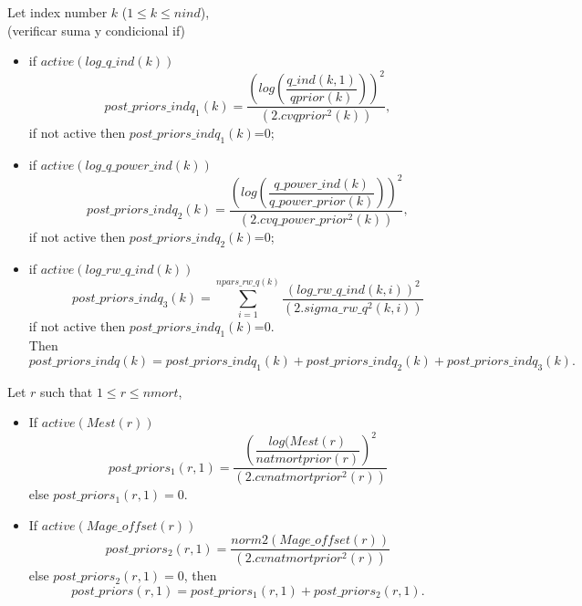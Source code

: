 \documentclass{article}
\begin{document}
Let index number $k$ ($1\leq k \leq nind$),\\ 
(verificar suma y condicional if)
\begin{itemize}
    \item if $active(log\_q\_ind(k))$
    \begin{equation}
        post\_priors\_indq_1(k) = \dfrac{\left(log\left(\dfrac{q\_ind(k,1)}{qprior(k)}\right)\right)^2}{(2.cvqprior^2(k))},
    \end{equation}
    if not active then $post\_priors\_indq_1(k)$=0;
    \item if $active(log\_q\_power\_ind(k))$
    \begin{equation}
        post\_priors\_indq_2(k) = \dfrac{\left(log\left(\dfrac{q\_power\_ind(k)}{q\_power\_prior(k)}\right)\right)^2}{(2.cvq\_power\_prior^2(k))},
    \end{equation}
    if not active then $post\_priors\_indq_2(k)$=0;
    \item if $active(log\_rw\_q\_ind(k))$
    \begin{equation}
        post\_priors\_indq_3(k) = \sum_{i=1}^{npars\_rw\_q(k)}\dfrac{(log\_rw\_q\_ind(k,i))^2}{(2.sigma\_rw\_q^2(k,i))}
    \end{equation}
    if not active then $post\_priors\_indq_1(k)$=0.\\
    
    Then 
    \begin{equation}
         post\_priors\_indq(k)=post\_priors\_indq_1(k)+post\_priors\_indq_2(k)+ post\_priors\_indq_3(k).
    \end{equation}
    
    \end{itemize}
    Let $r$ such that $1\leq r \leq nmort$,
    \begin{itemize}
        \item If $active(Mest(r))$
        \begin{equation}
            post\_priors_1(r,1) = \dfrac{\left(\dfrac{log(Mest(r)}{natmortprior(r)}\right)^2}{(2.cvnatmortprior^2(r))}
        \end{equation}
        else $post\_priors_1(r,1)=0$.
        \item If $active(Mage\_offset(r))$
        \begin{equation}
            post\_priors_2(r,1) = \dfrac{norm2(Mage\_offset(r))}{(2.cvnatmortprior^2(r))}
        \end{equation}
        else $post\_priors_2(r,1)=0$, then
        \begin{equation}
            post\_priors(r,1)=post\_priors_1(r,1)+post\_priors_2(r,1).
        \end{equation}
    \end{itemize}
\end{document}
